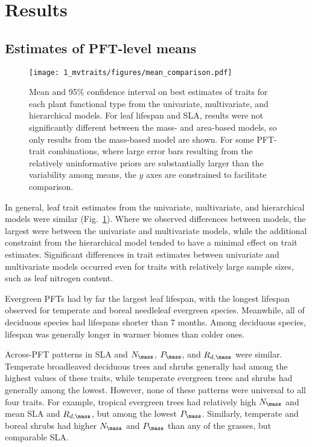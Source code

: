 \section{Results}\label{sec:mvtraits-results}

\subsection{Estimates of PFT-level means}

\begin{figure}
  \centering
  \texttt{[image: 1\_mvtraits/figures/mean\_comparison.pdf]}
  \caption{%
    Mean and 95\% confidence interval on best estimates of traits for each plant functional type from the univariate, multivariate, and hierarchical models.
    For leaf lifespan and SLA, results were not significantly different between the mass- and area-based models, so only results from the mass-based model are shown.
    For some PFT-trait combinations, where large error bars resulting from the relatively uninformative priors are substantially larger than the variability among means, the $y$ axes are constrained to facilitate comparison.
  }\label{fig:mvtraits-fig2}
\end{figure}

In general, leaf trait estimates from the univariate, multivariate, and hierarchical models were similar (Fig.~\ref{fig:mvtraits-fig2}).
Where we observed differences between models, the largest were between the univariate and multivariate models, while the additional constraint from the hierarchical model tended to have a minimal effect on trait estimates.
Significant differences in trait estimates between univariate and multivariate models occurred even for traits with relatively large sample sizes, such as leaf nitrogen content.

Evergreen PFTs had by far the largest leaf lifespan, with the longest lifespan observed for temperate and boreal needleleaf evergreen species.
Meanwhile, all of deciduous species had lifespans shorter than 7 months.
Among deciduous species, lifespan was generally longer in warmer biomes than colder ones.

Across-PFT patterns in SLA and $N_{\mass}$, $P_{\mass}$, and $R_{d,\mass}$ were similar.
Temperate broadleaved deciduous trees and shrubs generally had among the highest values of these traits, while temperate evergreen trees and shrubs had generally among the lowest.
However, none of these patterns were universal to all four traits.
For example, tropical evergreen trees had relatively high $N_{\mass}$ and mean SLA and $R_{d,\mass}$, but among the lowest $P_{\mass}$.
Similarly, temperate and boreal shrubs had higher $N_{\mass}$ and $P_{\mass}$ than any of the grasses, but comparable SLA\@.

